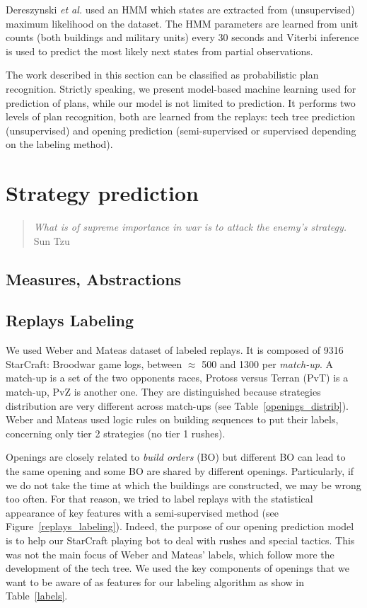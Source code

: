 Dereszynski \textit{et al.} \citep{HMMstrat_RTS_AIIDE11} used an HMM which states are extracted from (unsupervised) maximum likelihood on the dataset. The HMM parameters are learned from unit counts (both buildings and military units) every 30 seconds and Viterbi inference is used to predict the most likely next states from partial observations. %

The work described in this section can be classified as probabilistic plan recognition. Strictly speaking, we present model-based machine learning used for prediction of plans, while our model is not limited to prediction. It performs two levels of plan recognition, both are learned from the replays: tech tree prediction (unsupervised) and opening prediction (semi-supervised or supervised depending on the labeling method).

\section{Strategy prediction}
\label{sec:strategyprediction}

\begin{quotation}\textit{
What is of supreme importance in war is to attack the enemy's strategy.}\\
Sun Tzu\end{quotation}

\subsection{Measures, Abstractions}

\subsection{Replays Labeling}
We used Weber and Mateas \citep{weberStrat} dataset of labeled replays. It is composed of 9316 StarCraft: Broodwar game logs, between $\approx$ 500 and 1300 per \textit{match-up}. A match-up is a set of the two opponents races, Protoss versus Terran (PvT) is a match-up, PvZ is another one. They are distinguished because strategies distribution are very different across match-ups (see Table~\ref{openings_distrib}). Weber and Mateas used logic rules on building sequences to put their labels, concerning only tier 2 strategies (no tier 1 rushes).

Openings are closely related to \textit{build orders} (BO) but different BO can lead to the same opening and some BO are shared by different openings. Particularly, if we do not take the time at which the buildings are constructed, we may be wrong too often. For that reason, we tried to label replays with the statistical appearance of key features with a semi-supervised method (see Figure~\ref{replays_labeling}). Indeed, the purpose of our opening prediction model is to help our StarCraft playing bot to deal with rushes and special tactics. This was not the main focus of Weber and Mateas' labels, which follow more the development of the tech tree. We used the key components of openings that we want to be aware of as features for our labeling algorithm as show in Table~\ref{labels}.

